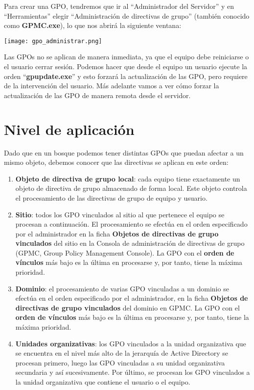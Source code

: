 Para crear una GPO, tendremos que ir al “Administrador del Servidor” y en “Herramientas” elegir “Administración de directivas de grupo” (también conocido como \textbf{GPMC.exe}), lo que nos abrirá la siguiente ventana:

\begin{center}
    \vspace{-15pt}
    \texttt{[image: gpo\_administrar.png]}
    \vspace{-25pt}
\end{center}

Las GPOs no se aplican de manera inmediata, ya que el equipo debe reiniciarse o el usuario cerrar sesión. Podemos hacer que desde el equipo un usuario ejecute la orden “\textbf{gpupdate.exe}” y esto forzará la actualización de las GPO, pero requiere de la intervención del usuario. Más adelante vamos a ver cómo forzar la actualización de las GPO de manera remota desde el servidor.


\section{Nivel de aplicación}
Dado que en un bosque podemos tener distintas GPOs que puedan afectar a un mismo objeto, debemos conocer que las directivas se aplican en este orden:

\begin{enumerate}
    \item \textbf{Objeto de directiva de grupo local}: cada equipo tiene exactamente un objeto de directiva de grupo almacenado de forma local. Este objeto controla el procesamiento de las directivas de grupo de equipo y usuario.

    \item \textbf{Sitio}: todos los GPO vinculados al sitio al que pertenece el equipo se procesan a continuación. El procesamiento se efectúa en el orden especificado por el administrador en la ficha \textbf{Objetos de directivas de grupo vinculados} del sitio en la Consola de administración de directivas de grupo (GPMC, Group Policy Management Console). La GPO con el \textbf{orden de vínculos} más bajo es la última en procesarse y, por tanto, tiene la máxima prioridad.

    \item \textbf{Dominio}: el procesamiento de varias GPO vinculadas a un dominio se efectúa en el orden especificado por el administrador, en la ficha \textbf{Objetos de directivas de grupo vinculados} del dominio en GPMC. La GPO con el \textbf{orden de vínculos} más bajo es la última en procesarse y, por tanto, tiene la máxima prioridad.

    \item \textbf{Unidades organizativas}: los GPO vinculados a la unidad organizativa que se encuentra en el nivel más alto de la jerarquía de Active Directory se procesan primero, luego las GPO vinculadas a su unidad organizativa secundaria y así sucesivamente. Por último, se procesan los GPO vinculados a la unidad organizativa que contiene el usuario o el equipo.
\end{enumerate}

